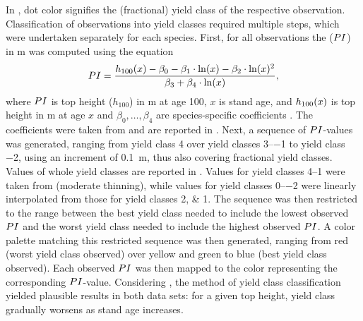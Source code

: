 In , dot color signifies the (fractional) yield class of the respective observation.  Classification of observations into yield classes required multiple steps, which were undertaken separately for each species.  First, for all observations the \ProductivityIndexText{} (\(PI{}\)) in \si{\meter} was computed using the equation
\begin{equation}
  \label{eq:NagelFunctionSolvedForProductivityIndex}
  PI{} = \frac{h_{100}{}(x) - \beta_0 - \beta_1 \cdot \ln(x) - \beta_2 \cdot \ln(x)^2 }{\beta_3 + \beta_4 \cdot \ln(x)},
\end{equation}
where \(PI{}\) is top height (\(h_{100}\)) in \si{\meter} at age \SI{100}{\year}, \(x\) is stand age, and \(h_{100}{}(x)\) is top height in \si{\meter} at age \(x\) and \(\beta_0, \ldots, \beta_4\) are species-specific coefficients \parencite{Nagel1999}.  The coefficients were taken from \textcite{Nagel1999} and are reported in .  Next, a sequence of \(PI{}\)-values was generated, ranging from yield class \num{4} over yield classes \numrange{3}{-1} to yield class \num{-2}, using an increment of \SI{0.1}{\meter}, thus also covering fractional yield classes.  Values of whole yield classes are reported in .  Values for yield classes \numrange{4}{1} were taken from \textcite{Schober1995} (moderate thinning), while values for yield classes \numrange{0}{-2} were linearly interpolated from those for yield classes \numlist{2;1}.   The sequence was then restricted to the range between the best yield class needed to include the lowest observed \(PI{}\) and the worst yield class needed to include the highest observed \(PI{}\).  A color palette matching this restricted sequence was then generated, ranging from red (worst yield class observed) over yellow and green to blue (best yield class observed).  Each observed \(PI{}\) was then mapped to the color representing the corresponding \(PI{}\)-value.  Considering , the method of yield class classification yielded plausible results in both data sets:  for a given top height, yield class gradually worsens as stand age increases.

